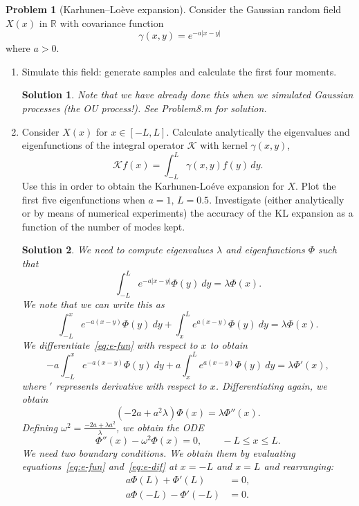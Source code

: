 \documentclass[11pt,a4paper]{article}
\newcommand{\real}{\mathbb R}
\theoremstyle{definition}
\newtheorem{problem}{Problem}
\theoremstyle{plain}
\newtheorem*{solution}{Solution}
\begin{document}
\begin{problem}[Karhunen--Loève expansion]
    Consider the Gaussian random field $X(x)$ in $\real$ with covariance function
    \[
        \gamma(x,y) = e^{-a |x-y|}
    \]
    where $a>0$.

\begin{enumerate}

\item Simulate this field: generate samples and calculate the first four moments.

\begin{solution}
Note that we have already done this when we simulated Gaussian processes (the OU process!). See Problem8.m for solution.
\end{solution}

\item Consider $X(x)$ for $x \in [-L,L]$. Calculate analytically the eigenvalues and eigenfunctions of the integral operator $\mathcal{K}$ with kernel $\gamma(x,y)$,
$$
\mathcal{K} f(x) = \int_{-L}^{L} \gamma(x,y) f(y) \, dy.
$$
Use this in order to obtain the Karhunen-Lo\'{e}ve expansion for $X$. Plot the first five eigenfunctions when $a=1, \, L=0.5$. Investigate (either analytically or by means of numerical experiments) the accuracy of the KL expansion as a function of the number of modes kept.

\begin{solution}
We need to compute eigenvalues $\lambda$ and eigenfunctions $\Phi$ such that
\[
\int_{-L}^L e^{-a|x-y|}\Phi(y) \ dy = \lambda \Phi(x).
\]
We note that we can write this as
\begin{equation}\label{eq:e-fun}
\int_{-L}^x e^{-a(x-y)}\Phi(y) \ dy + \int_{x}^L e^{a(x-y)}\Phi(y) \ dy = \lambda \Phi(x).
\end{equation}
We differentiate~\eqref{eq:e-fun} with respect to $x$ to obtain
\begin{equation}\label{eq:e-dif}
-a\int_{-L}^x e^{-a(x-y)}\Phi(y) \ dy + a\int_{x}^L e^{a(x-y)}\Phi(y) \ dy = \lambda \Phi'(x),
\end{equation}
where $'$ represents derivative with respect to $x$. Differentiating again, we obtain
\begin{equation}\label{eq:final}
(-2a+a^2\lambda)\Phi(x) = \lambda \Phi''(x).
\end{equation}
Defining $\omega^2 = \frac{-2a+\lambda a^2}{\lambda}$, we obtain the ODE
\[
\Phi''(x) -\omega^2 \Phi(x) = 0, \qquad -L\leq x \leq L.
\]
We need two boundary conditions. We obtain them by evaluating equations~\eqref{eq:e-fun} and~\eqref{eq:e-dif} at $x=-L$ and $x=L$ and rearranging:
\begin{align}
\label{bc-1} a\Phi(L)+\Phi'(L) &= 0, \\
\label{bc-2} a\Phi(-L)-\Phi'(-L) &= 0.
\end{align}


\end{solution}
\end{enumerate}
\end{problem}
\end{document}
